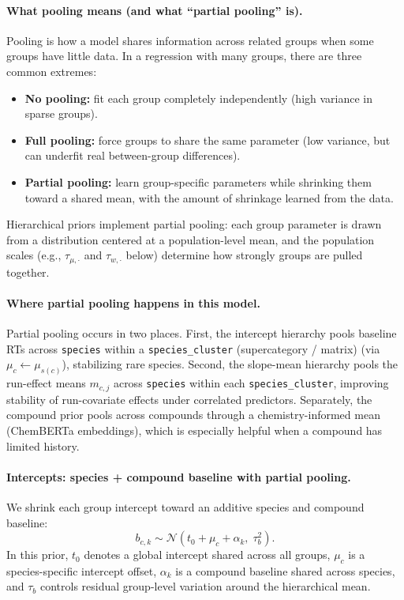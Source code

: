 \documentclass[11pt]{article}
\begin{document}
\paragraph{What pooling means (and what ``partial pooling'' is).}
Pooling is how a model shares information across related groups when some groups have little data. In a regression with
many groups, there are three common extremes:
\begin{itemize}
  \item \textbf{No pooling:} fit each group completely independently (high variance in sparse groups).
  \item \textbf{Full pooling:} force groups to share the same parameter (low variance, but can underfit real
  between-group differences).
  \item \textbf{Partial pooling:} learn group-specific parameters while shrinking them toward a shared mean, with the
  amount of shrinkage learned from the data.
\end{itemize}
Hierarchical priors implement partial pooling: each group parameter is drawn from a distribution centered at a
population-level mean, and the population scales (e.g., $\tau_{\mu,\cdot}$ and $\tau_{w,\cdot}$ below) determine how
strongly groups are pulled together.

\paragraph{Where partial pooling happens in this model.}
Partial pooling occurs in two places. First, the intercept hierarchy pools baseline RTs across \texttt{species} within a
\texttt{species\_cluster} (supercategory / matrix) (via $\mu_c \leftarrow \mu_{s(c)}$), stabilizing rare species. Second,
the slope-mean hierarchy pools the run-effect means $m_{c,j}$ across \texttt{species} within each \texttt{species\_cluster},
improving stability of run-covariate effects under correlated predictors. Separately, the compound prior pools across
compounds through a chemistry-informed mean (ChemBERTa embeddings), which is especially helpful when a compound has
limited history.

\paragraph{Intercepts: species + compound baseline with partial pooling.}
We shrink each group intercept toward an additive species and compound baseline:
\[
  b_{c,k} \sim \mathcal{N}\!\left(t_0 + \mu_c + \alpha_k,\; \tau_b^2\right).
\]
In this prior, $t_0$ denotes a global intercept shared across all groups, $\mu_c$ is a species-specific intercept offset,
$\alpha_k$ is a compound baseline shared across species, and $\tau_b$ controls residual group-level variation around the
hierarchical mean.
\end{document}
